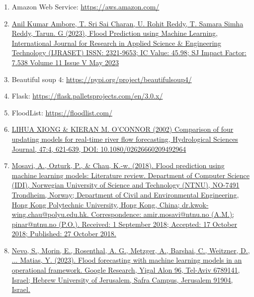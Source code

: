\documentclass[a4paper,12pt]{report}
\begin{document}
\begin{enumerate}

\item Amazon Web Service: \href{https://aws.amazon.com/}{https://aws.amazon.com/}

\item \href{https://www.ijraset.com/research-paper/flood-prediction-using-machine-learning}{Anil Kumar Ambore, T. Sri Sai Charan, U. Rohit Reddy, T. Samara Simha Reddy, Tarun. G (2023), Flood Prediction using Machine Learning, International Journal for Research in Applied Science \& Engineering Technology (IJRASET) ISSN: 2321-9653; IC Value: 45.98; SJ Impact Factor: 7.538 Volume 11 Issue V May 2023}

\item Beautiful soup 4: \href{https://pypi.org/project/beautifulsoup4/}{https://pypi.org/project/beautifulsoup4/}

\item Flask: \href{https://flask.palletsprojects.com/en/3.0.x/}{https://flask.palletsprojects.com/en/3.0.x/}

\item FloodList: \href{https://floodlist.com/}{https://floodlist.com/}

\item \href{https://www.tandfonline.com/doi/abs/10.1080/02626660209492964}{LIHUA XIONG \& KIERAN M. O'CONNOR (2002) Comparison of four updating models for real-time river flow forecasting, Hydrological Sciences Journal, 47:4, 621-639, DOI: 10.1080/02626660209492964}

\item \href{https://www.mdpi.com/2073-4441/10/11/1536}{Mosavi, A., Ozturk, P., \& Chau, K.-w. (2018). Flood prediction using machine learning models: Literature review. Department of Computer Science (IDI), Norwegian University of Science and Technology (NTNU), NO-7491 Trondheim, Norway; Department of Civil and Environmental Engineering, Hong Kong Polytechnic University, Hong Kong, China; dr.kwok-wing.chau@polyu.edu.hk. Correspondence: amir.mosavi@ntnu.no (A.M.); pinar@ntnu.no (P.O.). Received: 1 September 2018; Accepted: 17 October 2018; Published: 27 October 2018.}

\item \href{https://hess.copernicus.org/articles/26/4013/2022/}{Nevo, S., Morin, E., Rosenthal, A. G., Metzger, A., Barshai, C., Weitzner, D., ... Matias, Y. (2023). Flood forecasting with machine learning models in an operational framework. Google Research, Yigal Alon 96, Tel-Aviv 6789141, Israel; Hebrew University of Jerusalem, Safra Campus, Jerusalem 91904, Israel.}


\end{enumerate}
\end{document}
